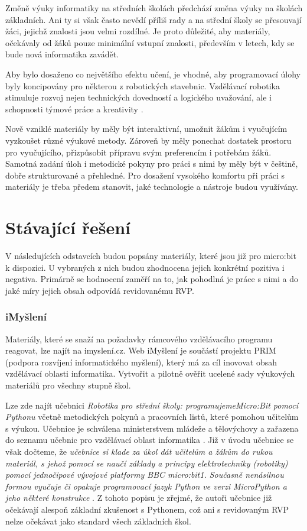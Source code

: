 \documentclass[
  digital,     %
  oneside,     %
  nosansbold,  %
  colorbold, %
  lof,         %
  nolot,         %
]{fithesis4}
\begin{document}
Změně výuky informatiky na středních školách předchází změna výuky na školách základních. Ani ty si však často nevědí příliš rady a na střední školy se přesouvají žáci, jejichž znalosti jsou velmi rozdílné. Je proto důležité, aby materiály,  očekávaly od žáků pouze minimální vstupní znalosti, především v letech, kdy se bude nová informatika zavádět.

Aby bylo dosaženo co největšího efektu učení, je vhodné, aby programovací úlohy byly koncipovány pro některou z robotických stavebnic. Vzdělávací robotika stimuluje rozvoj nejen technických dovedností a logického uvažování, ale i schopnosti týmové práce a kreativity \cite{Souza18}. 

Nově vzniklé materiály by měly být interaktivní, umožnit žákům i vyučujícím vyzkoušet různé výukové metody. Zároveň by měly ponechat dostatek prostoru pro vyučujícího, přizpůsobit přípravu svým preferencím i potřebám žáků. Samotná zadání úloh i metodické pokyny pro práci s nimi by měly být v češtině, dobře strukturované a přehledné. Pro dosažení vysokého komfortu při práci s materiály je třeba předem stanovit, jaké technologie a nástroje budou využívány.

\section{Stávající řešení}
V následujících odstavcích budou popsány materiály, které jsou již pro micro:bit k dispozici. U vybraných z nich budou zhodnocena jejich konkrétní pozitiva i negativa. Primárně se hodnocení zaměří na to, jak pohodlná je práce s nimi a do jaké míry jejich obsah odpovídá revidovanému RVP. 

\subsubsection{iMyšlení}
Materiály, které se snaží na požadavky rámcového vzdělávacího programu reagovat, lze najít na imyslení.cz. Web iMyšlení je součástí projektu PRIM (podpora rozvíjení informatického myšlení), který má za cíl inovovat obsah vzdělávací oblasti informatika. Vytvořit a pilotně ověřit ucelené sady výukových materiálů pro všechny stupně škol. 

Lze zde najít učebnici \textit{Robotika pro střední školy: programujeme\break Micro:Bit pomocí Pythonu} včetně metodických pokynů a pracovních listů, které pomohou učitelům s výukou. Učebnice je schválena ministerstvem mládeže a tělovýchovy a zařazena do seznamu učebnic pro vzdělávací oblast informatika \cite{Summerfield10}. Již v úvodu učebnice se však dočteme, že \textit{učebnice si klade za úkol dát učitelům a žákům do rukou materiál, s jehož pomocí se naučí základy a principy elektrotechniky (robotiky) pomocí jednočipové vývojové platformy BBC micro:bit1. Současně nenásilnou formou vyučuje či opakuje programovací jazyk Python ve verzi MicroPython a jeho některé konstrukce} \cite{pythonImysleni}. Z tohoto popisu je zřejmé, že autoři učebnice již očekávají alespoň základní zkušenost s Pythonem, což ani s revidovaným RVP nelze očekávat jako standard všech základních škol. 
\end{document}
